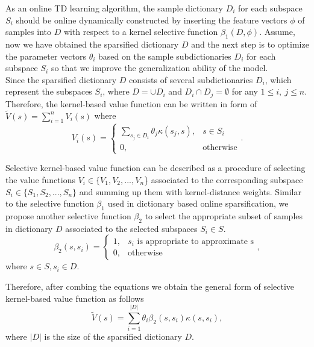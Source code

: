 \documentclass[conference]{IEEEtran}
\begin{document}
As an online TD learning algorithm, the sample dictionary $D_i$ for each subspace $S_i$ should be online dynamically constructed by inserting the feature vectors $\phi$ of samples into $D$ with respect to a kernel selective function $\beta_1(D, \phi)$. Assume, now we have obtained the sparsified dictionary $D$ and the next step is to optimize the parameter vectors $\theta_i$ based on the sample subdictionaries $D_i$ for each subspace $S_i$ so that we improve the generalization ability of the model.\\

Since the sparsified dictionary $D$ consists of several subdictionaries $D_i$, which represent the subspaces $S_i$, where $D=\cup D_i$ and $D_i \cap D_j = \emptyset$ for any $1 \leq i,\ j \leq n$. Therefore, the kernel-based value function can be written in form of $\widetilde{V}(s)=\sum_{i=1}^nV_i(s)$ where
\begin{equation}
	V_i(s) =	\begin{cases}
				\sum_{s_j\in D_t}\theta_j\kappa(s_j, s),& s\in S_i\\
           		0, & \text{otherwise}
      		\end{cases}.
\end{equation}

Selective kernel-based value function can be described as a procedure of selecting  the value functions $V_i \in \{V_1, V_2,..., V_n$\} associated to the corresponding subspace $S_i \in \{S_1, S_2,..., S_n\}$ and summing up them with kernel-distance weights. Similar to the selective function $\beta_1$ used in dictionary based online sparsification, we propose another selective function $\beta_2$ to select the appropriate subset of samples in dictionary $D$ associated to the selected subspaces $S_i \in S$.
\begin{equation}
  \beta_2(s, s_i) =
      \begin{cases}
			1,& s_i \text{\ is appropriate to approximate s}\\
           	0, & \text{otherwise}
      \end{cases},
\end{equation}
where $s\in S, s_i \in D$.

Therefore, after combing the equations we obtain the general form of selective kernel-based value function as follows
\begin{equation}
	\widetilde{V}(s)=\sum_{i=1}^{|D|}\theta_i \beta_2(s, s_i)\kappa(s, s_i), 
\end{equation}
where $|D|$ is the size of the sparsified dictionary $D$.
\end{document}

